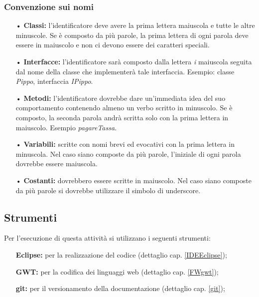 {{		\subsubsection{Convenzione sui nomi}{
			\begin{itemize}
				\item[•] {\textbf{Classi:} l'identificatore deve avere la prima
				lettera maiuscola e tutte le altre minuscole. Se è composto da più
				parole, la prima lettera di ogni parola deve essere in maiuscolo e
				non ci devono essere dei caratteri speciali.
				}
				\item[•] {\textbf{Interfacce:} l'identificatore sarà composto dalla 
				lettera \textit{i} maiuscola seguita dal nome della classe che
				implementerà tale interfaccia. Esempio: classe \textit{Pippo},
				interfaccia \textit{IPippo}.
				}
				\item[•] {\textbf{Metodi:} l'identificatore dovrebbe dare
				un'immediata idea del suo comportamento contenendo almeno un verbo
				scritto in minuscolo. Se è composto, la seconda parola andrà scritta
				solo con la prima lettera in maiuscolo. Esempio \textit{pagareTassa}.
				}
				\item[•] {\textbf{Variabili:} scritte con nomi brevi ed evocativi con la prima lettera in minuscola. Nel caso siano composte da più parole, l'iniziale di ogni parola dovrebbe essere maiuscola.}
				\item[•] {\textbf{Costanti:} dovrebbero essere scritte in maiuscolo.
				Nel caso siano composte da più parole si dovrebbe utilizzare il
				simbolo di underscore.}
			\end{itemize}
			}	
		}
		
\subsection{Strumenti} {
Per l'esecuzione di questa attività si utilizzano i seguenti strumenti:
\begin{itemize}
	\item []{\textbf{Eclipse:} per la realizzazione del codice (dettaglio cap. \ref{IDEEclipse});}
	\item []{\textbf{GWT:} per la codifica dei linguaggi web (dettaglio cap. \ref{FWgwt});}
	\item []{\textbf{git:} per il versionamento della documentazione (dettaglio cap. \ref{git});}
\end{itemize}

}%

}